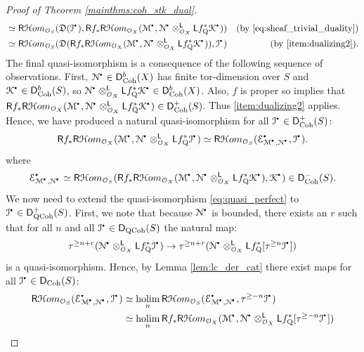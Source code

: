 \documentclass{amsart}
\theoremstyle{plain}
\theoremstyle{definition}
\theoremstyle{remark}
\numberwithin{equation}{section}
\newcommand{\itemref}[1]{\eqref{#1}}
\newcommand{\Orb}{\mathcal{O}}
\newcommand{\trunc}[1]{\tau^{{#1}}}
\newcommand{\RDERF}{\mathsf{R}}
\newcommand{\LDERF}{\mathsf{L}}
\newcommand{\DCAT}{\mathsf{D}}
\newcommand{\SHom}{\mathcal{H}om}
\newcommand{\SRHom}{\RDERF\SHom}
\newcommand{\tensor}{\otimes}
\newcommand{\homotopic}{\simeq}
\newcommand{\shv}[1]{\mathcal{{#1}}}
\newcommand{\holim}[1]{\underset{#1}{\mathrm{holim}}\,}
\newcommand{\QCPSH}[1]{{#1}_{*}}
\newcommand{\QCPBK}[1]{{#1}_{\mathrm{Q}}^*}
\newcommand{\DQCOH}{\DCAT_{\mathrm{QCoh}}}
\newcommand{\DCOH}{\DCAT_{\mathrm{Coh}}}
\newcommand{\sbt}{\,\begin{picture}(-1,-1)(0,-2)\circle*{1.5}\end{picture}\ }
\newcommand{\cplx}[1]{\shv{{#1}}^{\sbt}}
\newcommand{\DUAL}[1]{\mathfrak{D}({#1})}
\begin{document}
\begin{proof}[Proof of Theorem \ref{mainthms:coh_stk_dual}]
\begin{align*}
    &\homotopic \SRHom_{\Orb_S}(\DUAL{\cplx{I}},\RDERF
    \QCPSH{f}\SRHom_{\Orb_X} ( \cplx{M}, \cplx{N}
    \tensor_{\Orb_X}^{\LDERF} \LDERF \QCPBK{f}\cplx{K}))
    &\mbox{(by \eqref{eq:sheaf_trivial_duality})}\\ 
    &\homotopic \SRHom_{\Orb_S}(\DUAL{\RDERF \QCPSH{f}\SRHom_{\Orb_X}
      ( \cplx{M}, \cplx{N} \tensor_{\Orb_X}^{\LDERF} \LDERF
      \QCPBK{f}\cplx{K})}, \cplx{I}) & \mbox{(by \itemref{item:dualizing2})}.
  \end{align*}
  The final quasi-isomorphism is a consequence of the following
  sequence of observations. First, $\cplx{N} \in \DCOH^b(X)$ has
  finite tor-dimension over $S$ and $\cplx{K} \in \DCOH^b(S)$, so $\cplx{N}
  \tensor^{\LDERF}_{\Orb_X} \LDERF \QCPBK{f}\cplx{K} \in
  \DCOH^b(X)$. Also, $f$ is proper so \cite[6.4.4 \& 10.13]{MR2312554}
  implies that $\RDERF f_*\SRHom_{\Orb_X} ( \cplx{M}, \cplx{N}
  \tensor_{\Orb_X}^{\LDERF} \LDERF \QCPBK{f}\cplx{K}) \in
  \DCOH^+(S)$. Thus \itemref{item:dualizing2} applies.  Hence, we have
  produced a natural quasi-isomorphism for all $\cplx{I} \in \DCOH^+(S)$:
  \begin{equation}
    \RDERF \QCPSH{f}\SRHom_{\Orb_X}(\cplx{M},\cplx{N}
    \tensor_{\Orb_X}^{\LDERF } \LDERF \QCPBK{f}\cplx{I}) \homotopic
    \SRHom_{\Orb_S}(\cplx{E}_{\cplx{M},\cplx{N}},\cplx{I}). \label{eq:quasi_perfect}  
  \end{equation}  
  where
  \[
  \cplx{E}_{\cplx{M},\cplx{N}} \homotopic
  \SRHom_{\Orb_S}(\RDERF \QCPSH{f}\SRHom_{\Orb_X}(\cplx{M},\cplx{N}
  \tensor_{\Orb_X}^{\LDERF } \LDERF
  \QCPBK{f}\cplx{K}),\cplx{K}) \in \DCOH^-(S). 
  \]
  We now need to extend the quasi-isomorphism \eqref{eq:quasi_perfect}
  to $\cplx{I} \in \DQCOH^+(S)$.  First, we note that because
  $\cplx{N}$ is bounded, there
  exists an $r$ such that for all $n$ and all $\cplx{I} \in
  \DQCOH(S)$ the natural map:
  \[
  \trunc{\geq n+r}(\cplx{N}
  \tensor_{\Orb_X}^{\LDERF } \LDERF
  \QCPBK{f}\cplx{I}) \to   \trunc{\geq n+r}(\cplx{N}
  \tensor_{\Orb_X}^{\LDERF } \LDERF
  \QCPBK{f}[\trunc{\geq n}\cplx{I}]) 
  \]
  is a quasi-isomorphism. Hence, by Lemma \ref{lem:lc_der_cat} there exist maps for all
  $\cplx{I} \in \DCOH(S)$: 
  \begin{align*}
    \SRHom_{\Orb_S}(\cplx{E}_{\cplx{M},\cplx{N}},\cplx{I}) &
    \homotopic \holim{n}
    \SRHom_{\Orb_S}(\cplx{E}_{\cplx{M},\cplx{N}},\trunc{\geq-n
    }\cplx{I})\\
    &\homotopic \holim{n} \RDERF f_*\SRHom_{\Orb_X}(\cplx{M},\cplx{N}
    \tensor_{\Orb_X}^\LDERF \LDERF \QCPBK{f}[\trunc{\geq -n}\cplx{I}])\\

\end{align*}
\end{proof}
\end{document}
